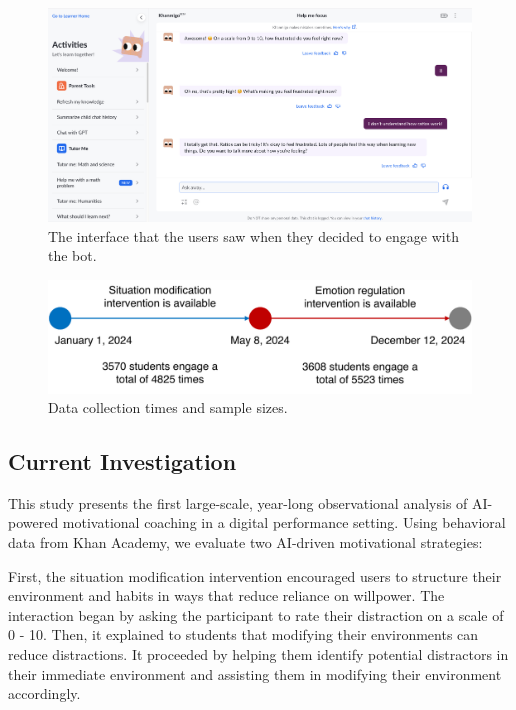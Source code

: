 \documentclass[11pt]{report}
\begin{document}
\begin{mainf}
\begin{figure}
    \centering
    \includegraphics[width=0.95\linewidth]{interface.png}
    \caption{The interface that the users saw when they decided to engage with the bot.}
    \label{fig:interface}
\end{figure}

\begin{figure}
    \centering
    \includegraphics[width=0.95\linewidth]{sample.pdf}
    \caption{Data collection times and sample sizes.}
    \label{fig:sample}
\end{figure}


\subsection*{Current Investigation}
This study presents the first large-scale, year-long observational analysis of AI-powered motivational coaching in a digital performance setting. 
Using behavioral data from Khan Academy, we evaluate two AI-driven motivational strategies:

First, the situation modification intervention encouraged users to structure their environment and habits in ways that reduce reliance on willpower. The interaction began by asking the participant to rate their distraction on a scale of 0 - 10. Then, it explained to students that modifying their environments can reduce distractions.
It proceeded by helping them identify potential distractors in their immediate environment and assisting them in modifying their environment accordingly.


\end{mainf}
\end{document}
